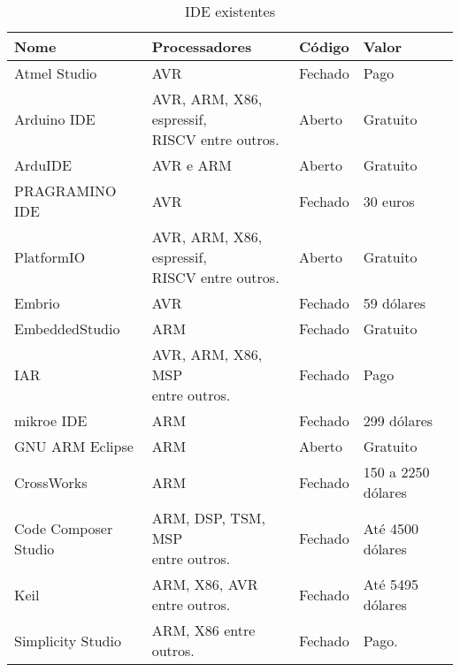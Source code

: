 \begin{table}[]
\centering
\caption{IDE existentes}
\label{ides}
\begin{tabular}{@{}llll@{}}
\toprule
Nome                  & Processadores                                          & Código  & Valor              \\ \midrule
Atmel Studio          & AVR                                           & Fechado & Pago               \\
Arduino IDE           & \makecell[l]{AVR, ARM, X86, espressif,\\RISCV entre outros.} & Aberto  & Gratuito           \\
ArduIDE               & AVR e ARM                                     & Aberto  & Gratuito           \\
PRAGRAMINO IDE        & AVR                                           & Fechado & 30 euros           \\
PlatformIO            & \makecell[l]{AVR, ARM, X86, espressif,\\RISCV entre outros.} & Aberto  & Gratuito           \\
Embrio                & AVR                                                    & Fechado & 59 dólares         \\
EmbeddedStudio        & ARM                                                    & Fechado & Gratuito           \\
IAR                   & \makecell[l]{AVR, ARM, X86,  MSP\\entre outros.}                      & Fechado & Pago               \\
mikroe IDE            & ARM                                                    & Fechado & 299 dólares        \\
GNU ARM Eclipse       & ARM                                                    & Aberto  & Gratuito           \\
CrossWorks            & ARM                                                    & Fechado & 150 a 2250 dólares \\
Code Composer Studio  & \makecell[l]{ARM, DSP, TSM,  MSP\\entre outros.}                      & Fechado & Até 4500 dólares   \\
Keil                  & \makecell[l]{ARM, X86, AVR\\entre outros.}                            & Fechado & Até 5495 dólares   \\
Simplicity Studio     & ARM, X86 entre outros.                                 & Fechado & Pago.              \\ \bottomrule
\end{tabular}
\end{table}

